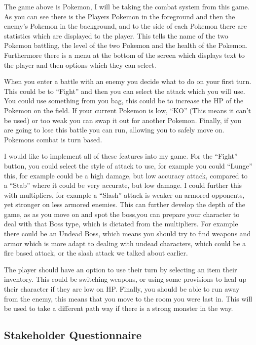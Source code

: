 \documentclass[12pt]{article}
\begin{document}
The game above is Pokemon, I will be taking the combat system from this game. As you can see there is the Players Pokemon in the foreground and then the enemy’s Pokemon in the background, and to the side of each Pokemon there are statistics which are displayed to the player. This tells the name of the two Pokemon battling, the level of the two Pokemon and the health of the Pokemon. Furthermore there is a menu at the bottom of the screen which displays text to the player and then options which they can select.

When you enter a battle with an enemy you decide what to do on your first turn. This could be to “Fight” and then you can select the attack which you will use. You could use something from you bag, this could be to increase the HP of the Pokemon on the field. If your current Pokemon is low, “KO” (This means it can’t be used) or too weak you can swap it out for another Pokemon. Finally, if you are going to lose this battle you can run, allowing you to safely move on. Pokemons combat is turn based.

I would like to implement all of these features into my game. For the “Fight” button, you could select the style of attack to use, for example you could “Lunge” this, for example could be a high damage, but low accuracy attack, compared to a “Stab” where it could be very accurate, but low damage. I could further this with multipliers, for example a “Slash” attack is weaker on armored opponents, yet stronger on less armored enemies. This can further develop the depth of the game, as as you move on and spot the boss,you can prepare your character to deal with that Boss type, which is dictated from the multipliers. For example there could be an Undead Boss, which means you should try to find weapons and armor which is more adapt to dealing with undead characters, which could be a fire based attack, or the slash attack we talked about earlier.

The player should have an option to use their turn by selecting an item their inventory. This could be switching weapons, or using some provisions to heal up their character if they are low on HP. Finally, you should be able to run away from the enemy, this means that you move to the room you were last in. This will be used to take a different path way if there is a strong monster in the way.

		\subsection{Stakeholder Questionnaire}
\end{document}
